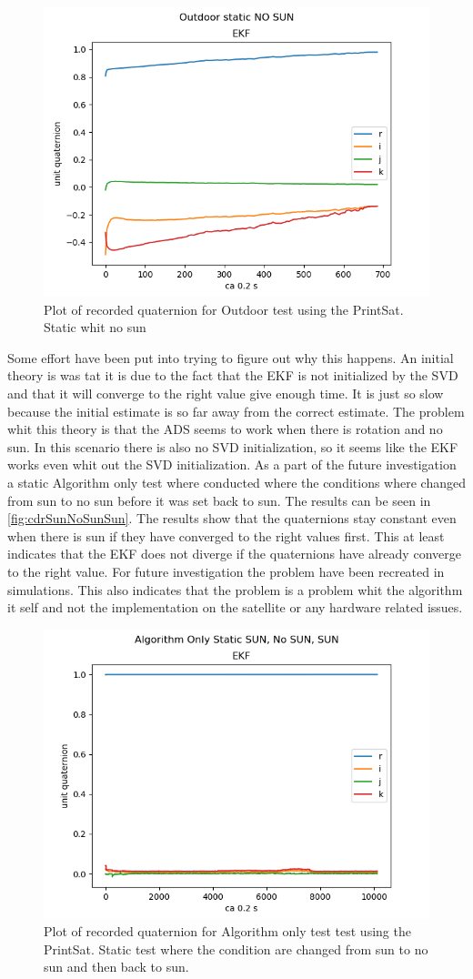 \begin{figure}[tbp]
	\centering
	\includegraphics[width=0.6\columnwidth]{./Pictures/run3OutdoorStaticNOSUN}
	\caption{Plot of recorded quaternion for Outdoor test using the PrintSat. Static whit  no sun}
	\label{fig:OutdoorNoRotationNoSun}
\end{figure}         

Some effort have been put into trying to figure out why this happens. An initial theory is was tat it is due to the fact that the EKF is not initialized by the SVD and that it will converge to the right value give enough time. It is just so slow because the initial estimate is so far away from the correct estimate. The problem whit this theory is that the ADS seems to work when there is rotation and no sun. In this scenario there is also no SVD initialization, so it seems like the EKF works even whit out the SVD initialization. As a part of the future investigation a static Algorithm only test where conducted where the conditions where changed from sun to no sun before it was set back to sun. The results can be seen in \autoref{fig:cdrSunNoSunSun}. The results show that the quaternions stay constant even when there is sun if they have converged to the right values first. This at least indicates that the EKF does not diverge if the quaternions have already converge to the right value. For future investigation the problem have been recreated in simulations. This also indicates that the problem is a problem whit the algorithm it self and not the implementation on the satellite or any hardware related issues. 

\begin{figure}[tbp]
	\centering
	\includegraphics[width=0.6\columnwidth]{./Pictures/cdrRun1StaticSunEclipsSun}
	\caption{Plot of recorded quaternion for Algorithm only test test using the PrintSat. Static test where the condition are changed from sun to no sun and then back to sun. }
	\label{fig:cdrSunNoSunSun}
\end{figure} 

